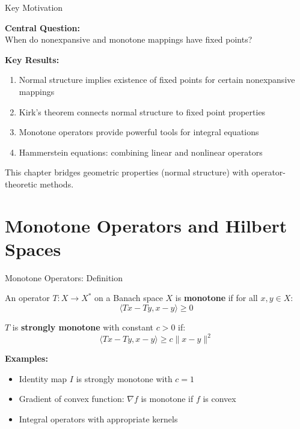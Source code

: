 \documentclass[aspectratio=169,10pt]{beamer}
\begin{document}
\begin{frame}{Key Motivation}
    \begin{center}
        \Large \textbf{Central Question:}\\[0.3cm]
        When do nonexpansive and monotone mappings have fixed points?
    \end{center}

    \vspace{0.5cm}

    \textbf{Key Results:}
    \begin{enumerate}
        \item Normal structure implies existence of fixed points for certain nonexpansive mappings
        \item Kirk's theorem connects normal structure to fixed point properties
        \item Monotone operators provide powerful tools for integral equations
        \item Hammerstein equations: combining linear and nonlinear operators
    \end{enumerate}

    \vspace{0.3cm}
    This chapter bridges geometric properties (normal structure) with operator-theoretic methods.
\end{frame}

\section{Monotone Operators and Hilbert Spaces}

\begin{frame}{Monotone Operators: Definition}
    \begin{definition}
        An operator $T: X \to X^*$ on a Banach space $X$ is \textbf{monotone} if for all $x, y \in X$:
        \[
            \langle Tx - Ty, x - y \rangle \geq 0
        \]
    \end{definition}

    \vspace{0.3cm}

    \begin{definition}
        $T$ is \textbf{strongly monotone} with constant $c > 0$ if:
        \[
            \langle Tx - Ty, x - y \rangle \geq c\|x - y\|^2
        \]
    \end{definition}

    \vspace{0.3cm}

    \textbf{Examples:}
    \begin{itemize}
        \item Identity map $I$ is strongly monotone with $c = 1$
        \item Gradient of convex function: $\nabla f$ is monotone if $f$ is convex
        \item Integral operators with appropriate kernels
    \end{itemize}
\end{frame}
\end{document}
